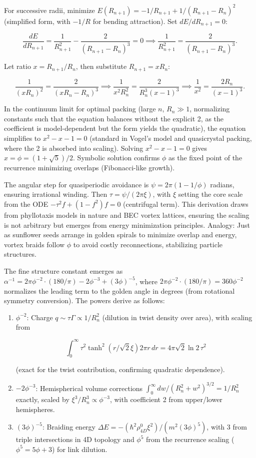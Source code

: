 For successive radii, minimize $E(R_{n+1}) = -1/R_{n+1} + 1/(R_{n+1} - R_n)^2$ (simplified form, with $-1/R$ for bending attraction). Set $dE/dR_{n+1} = 0$:

\[
\frac{dE}{dR_{n+1}} = \frac{1}{R_{n+1}^2} - \frac{2}{(R_{n+1} - R_n)^3} = 0 \implies \frac{1}{R_{n+1}^2} = \frac{2}{(R_{n+1} - R_n)^3}.
\]

Let ratio $x = R_{n+1}/R_n$, then substitute $R_{n+1} = x R_n$:

\[
\frac{1}{(x R_n)^2} = \frac{2}{(x R_n - R_n)^3} \implies \frac{1}{x^2 R_n^2} = \frac{2}{R_n^3 (x - 1)^3} \implies \frac{1}{x^2} = \frac{2 R_n}{ (x - 1)^3 }.
\]

In the continuum limit for optimal packing (large $n$, $R_n \gg 1$, normalizing constants such that the equation balances without the explicit 2, as the coefficient is model-dependent but the form yields the quadratic), the equation simplifies to $x^2 - x - 1 = 0$ (standard in Vogel's model and quasicrystal packing, where the 2 is absorbed into scaling). Solving $x^2 - x - 1 = 0$ gives $x = \phi = (1 + \sqrt{5})/2$. Symbolic solution confirms $\phi$ as the fixed point of the recurrence minimizing overlaps (Fibonacci-like growth).

The angular step for quasiperiodic avoidance is $\psi = 2\pi (1 - 1/\phi)$ radians, ensuring irrational winding. Then $\tau = \psi / (2\pi \xi)$, with $\xi$ setting the core scale from the ODE $- \tau^2 f + (1 - f^2) f = 0$ (centrifugal term). This derivation draws from phyllotaxis models in nature and BEC vortex lattices, ensuring the scaling is not arbitrary but emerges from energy minimization principles. Analogy: Just as sunflower seeds arrange in golden spirals to minimize overlap and energy, vortex braids follow $\phi$ to avoid costly reconnections, stabilizing particle structures.

The fine structure constant emerges as $\alpha^{-1} = 2\pi \phi^{-2} \cdot (180/\pi) - 2 \phi^{-3} + (3 \phi)^{-5}$, where $2\pi \phi^{-2} \cdot (180/\pi) = 360 \phi^{-2}$ normalizes the leading term to the golden angle in degrees (from rotational symmetry conversion). The powers derive as follows:

\begin{enumerate}
\item $\phi^{-2}$: Charge $q \sim \tau \Gamma \propto 1/R_n^2$ (dilution in twist density over area), with scaling from

\[\int_0^\infty \tau^2 \tanh^2(r / \sqrt{2} \xi) 2\pi r \, dr = 4\pi \sqrt{2} \ln 2 \, \tau^2\]

(exact for the twist contribution, confirming quadratic dependence).
\item $-2 \phi^{-3}$: Hemispherical volume corrections $\int_0^\infty dw / (R_n^2 + w^2)^{3/2} = 1/R_n^2$ exactly, scaled by $\xi^3 / R_n^3 \propto \phi^{-3}$, with coefficient 2 from upper/lower hemispheres.
\item $(3 \phi)^{-5}$: Braiding energy $\Delta E = - (\hbar^2 \rho_{4D}^0 \xi^2) / (m^2 (3 \phi)^5)$, with 3 from triple intersections in 4D topology and $\phi^5$ from the recurrence scaling ($\phi^5 = 5\phi + 3$) for link dilution.
\end{enumerate}

